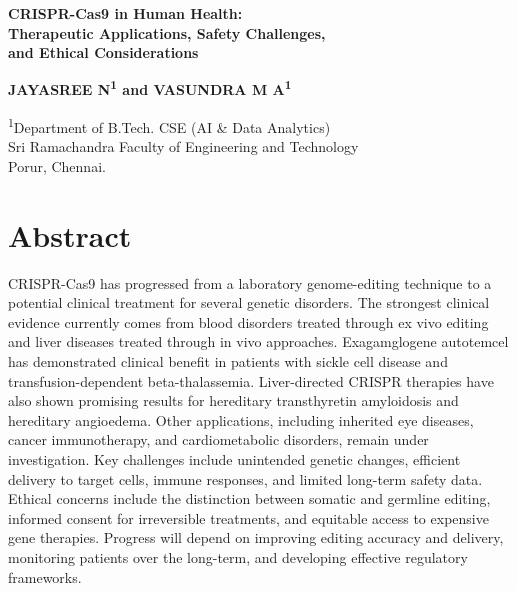 \documentclass[11pt,a4paper]{article}
\author{}
\date{}
\begin{document}
\begin{center}

{\Large\bfseries
CRISPR-Cas9 in Human Health:\\[4pt]
Therapeutic Applications, Safety Challenges,\\[4pt]
and Ethical Considerations
\par}

\vspace{12pt}

{\normalsize\bfseries
JAYASREE N\textsuperscript{1} and VASUNDRA M A\textsuperscript{1}
\par}

\vspace{4pt}

{\small
\textsuperscript{1}Department of B.Tech. CSE (AI \& Data Analytics)\\
Sri Ramachandra Faculty of Engineering and Technology\\
Porur, Chennai.
\par}

\end{center}

\vspace{6pt}

\section*{Abstract}
CRISPR-Cas9 has progressed from a laboratory genome-editing technique to a potential clinical treatment for several genetic disorders. The strongest clinical evidence currently comes from blood disorders treated through ex vivo editing and liver diseases treated through in vivo approaches. Exagamglogene autotemcel has demonstrated clinical benefit in patients with sickle cell disease and transfusion-dependent beta-thalassemia. Liver-directed CRISPR therapies have also shown promising results for hereditary transthyretin amyloidosis and hereditary angioedema. Other applications, including inherited eye diseases, cancer immunotherapy, and cardiometabolic disorders, remain under investigation. Key challenges include unintended genetic changes, efficient delivery to target cells, immune responses, and limited long-term safety data. Ethical concerns include the distinction between somatic and germline editing, informed consent for irreversible treatments, and equitable access to expensive gene therapies. Progress will depend on improving editing accuracy and delivery, monitoring patients over the long-term, and developing effective regulatory frameworks.
\end{document}
